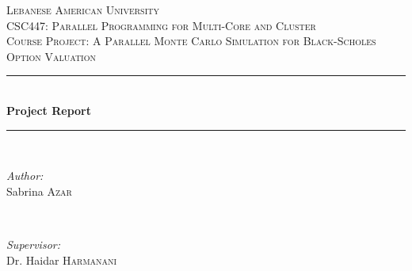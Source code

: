 \documentclass[12pt]{article}
\begin{document}
\begin{titlepage}

\newcommand{\HRule}{\rule{\linewidth}{0.5mm}} %

\center %
 

\textsc{\LARGE Lebanese American University}\\[1.5cm] %
\textsc{\Large CSC447: Parallel Programming for Multi-Core and Cluster}\\[0.5cm] %
\textsc{\large Course Project: A Parallel Monte Carlo Simulation for Black-Scholes Option Valuation}\\[0.5cm] %


\HRule \\[0.4cm]
{ \huge \bfseries Project Report}\\[0.4cm] %
\HRule \\[1.5cm]
 

\begin{minipage}{0.4\textwidth}
\begin{flushleft} \large
\emph{Author:}\\
Sabrina \textsc{Azar} %
\end{flushleft}
\end{minipage}
~
\begin{minipage}{0.4\textwidth}
\begin{flushright} \large
\emph{Supervisor:} \\
Dr. Haidar \textsc{Harmanani} %
\end{flushright}
\end{minipage}\\[2cm]


\end{titlepage}
\end{document}
